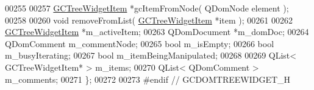 \begin{DoxyCode}
00255 
00257   \hyperlink{class_g_c_tree_widget_item}{GCTreeWidgetItem} *gcItemFromNode( QDomNode element );
00258 
00260   \textcolor{keywordtype}{void} removeFromList( \hyperlink{class_g_c_tree_widget_item}{GCTreeWidgetItem} *item );
00261 
00262   \hyperlink{class_g_c_tree_widget_item}{GCTreeWidgetItem} *m\_activeItem;
00263   QDomDocument     *m\_domDoc;
00264   QDomComment       m\_commentNode;
00265   \textcolor{keywordtype}{bool}              m\_isEmpty;
00266   \textcolor{keywordtype}{bool}              m\_busyIterating;
00267   \textcolor{keywordtype}{bool}              m\_itemBeingManipulated;
00268 
00269   QList< GCTreeWidgetItem* > m\_items;
00270   QList< QDomComment > m\_comments;
00271 \};
00272 
00273 \textcolor{preprocessor}{#endif // GCDOMTREEWIDGET\_H}
\end{DoxyCode}
